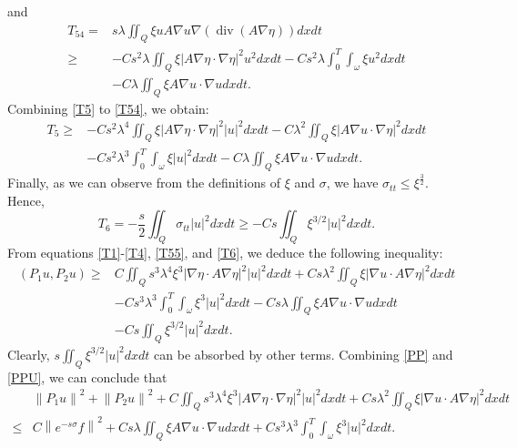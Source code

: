 \documentclass[9pt,reqno]{amsart}
\theoremstyle{plain}
\numberwithin{equation}{section}
\numberwithin{theorem}{section}
\DeclareMathOperator*{\Div}{\mathrm{div}}
\begin{document}
	and
	\begin{equation}\label{T54}
		\begin{split}
			T_{54}=&s \lambda \iint_Q \xi u A \nabla u \nabla(\Div(A \nabla \eta))dx  d t\\
			\ge&
			-C s^2 \lambda \iint_Q \xi \left|A \nabla \eta \cdot \nabla \eta\right|^2 u^2dx  d t-C s^2 \lambda \int_0^T \int_{\omega}\xi  u^2dx  d t\\
			&-C \lambda \iint_Q \xi A \nabla u \cdot \nabla udx  d t.
		\end{split}
	\end{equation}
	Combining \eqref{T5} to \eqref{T54}, we obtain:
	\begin{equation}\label{T55}
		\begin{split}
			T_5 \geq&-Cs^2 \lambda^4 \iint_Q \xi\left|A \nabla \eta \cdot \nabla \eta\right|^2 |u|^2dx  d t -C\lambda^2\iint_{Q} \xi \left| A\nabla u\cdot \nabla \eta \right| ^2 dx  dt\\
			&-C s^2 \lambda^3 \int_0^T \int_{\omega} \xi|u|^2dx  d t- C\lambda \iint_Q  \xi A \nabla u \cdot \nabla u dx  d t.
		\end{split}
	\end{equation}
	Finally, as we can observe from the definitions of $\xi$ and $\sigma$, we have $\sigma_{tt} \leq \xi^{\frac{3}{2}}$. Hence,
	\begin{equation}\label{T6}
		T_6 =-\frac{s}{2} \iint_Q \sigma_{t t}|u|^2dx  d t \geq-C s \iint_Q \xi^{3 / 2}|u|^2dx  d t.
	\end{equation}
	From equations \eqref{T1}-\eqref{T4}, \eqref{T55}, and \eqref{T6}, we deduce the following inequality:
	\begin{equation}\label{PPU}
		\begin{split}
			\left(P_1 u, P_2 u\right)
			\geq& C\iint_Q s^3 \lambda^4 \xi^3 |\nabla \eta \cdot A \nabla \eta|^2 |u|^2 dx dt  + C s  \lambda^2 \iint_Q\xi|\nabla u \cdot A \nabla \eta|^2 dx  d t\\
			&-Cs^3 \lambda^3 \int_0^T \int_{\omega} \xi^3|u|^2dx  d t
			- Cs \lambda \iint_Q \xi A \nabla u \cdot \nabla udx  d t\\
			&- Cs \iint_Q \xi^{3 / 2}|u|^2dx  d t.
		\end{split}
	\end{equation}
	Clearly, $s \iint_Q \xi^{3 / 2}|u|^2dx dt$ can be absorbed by other terms. Combining \eqref{PP} and \eqref{PPU}, we can conclude that
	\begin{equation}\label{LLU2}
		\begin{split}
			&\left\|P_1 u\right\|^2+\left\|P_2 u\right\|^2+C\iint_Q s^3 \lambda^4 \xi^3\left|A \nabla \eta \cdot \nabla \eta \right|^2|u|^2 dx dt  + C s  \lambda^2 \iint_Q\xi|\nabla u \cdot A \nabla \eta|^2 dx  d t\\
			\leq& C\left\|e^{-s \sigma} f\right\|^2
			+Cs \lambda \iint_Q \xi A \nabla u \cdot \nabla udx  d t+Cs^3 \lambda^3 \int_0^T \int_{\omega} \xi^3|u|^2dx  d t.
		\end{split}
	\end{equation}
\end{document}
